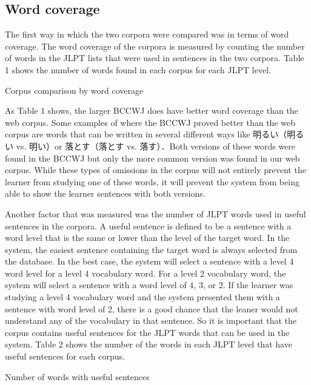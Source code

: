 \documentclass[english]{jnlp_1.4}
\begin{document}
\subsection{Word coverage}

The first way in which the two corpora were compared was in terms of word coverage. The word coverage of the corpora is measured by counting the number of words in the JLPT lists that were used in sentences in the two corpora. Table 1 shows the number of words found in each corpus for each JLPT level.

\begin{table}[b]
  \caption{Corpus comparison by word coverage}
  \label{table1}

\end{table}

As Table 1 shows, the larger BCCWJ does have better word coverage than the web corpus. Some examples of where the BCCWJ proved better than the web corpus are words that can be written in several different ways like 明るい（明るい vs. 明い）or 落とす（落とす vs. 落す）．Both versions of these words were found in the BCCWJ but only the more common version was found in our web corpus. While these types of omissions in the corpus will not entirely prevent the learner from studying one of these words, it will prevent the system from being able to show the learner sentences with both versions.

Another factor that was measured was the number of JLPT words used in useful sentences in the corpora. A useful sentence is defined to be a sentence with a word level that is the same or lower than the level of the target word. In the system, the easiest sentence containing the target word is always selected from the database. In the best case, the system will select a sentence with a level 4 word level for a level 4 vocabulary word. For a level 2 vocabulary word, the system will select a sentence with a word level of 4, 3, or 2. If the learner was studying a level 4 vocabulary word and the system presented them with a sentence with word level of 2, there is a good chance that the leaner would not understand any of the vocabulary in that sentence. So it is important that the corpus contains useful sentences for the JLPT words that can be used in the system. Table 2 shows the number of the words in each JLPT level that have useful sentences for each corpus.

\begin{table}[t]
  \caption{Number of words with useful sentences}
  \label{table2}

\end{table}
\end{document}
